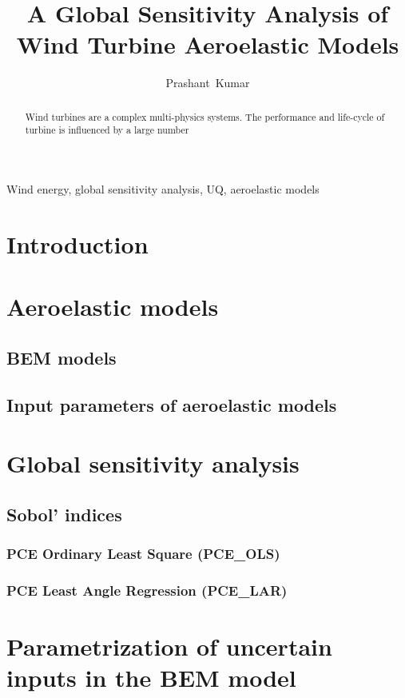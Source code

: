 \documentclass[review]{elsarticle}
\title{A Global Sensitivity Analysis of Wind Turbine Aeroelastic Models}
\numberwithin{equation}{section}
\numberwithin{equation}{section}
\begin{document}
\begin{frontmatter}
\author[]{Prashant~Kumar}
\begin{abstract}
Wind turbines are a complex multi-physics systems. The performance and life-cycle of turbine is influenced by a large number
\end{abstract}
\begin{keyword}
Wind energy, global sensitivity analysis, UQ, aeroelastic models 
\end{keyword}
\end{frontmatter}
\linenumbers
\section{Introduction}
\section{Aeroelastic models}
\subsection{BEM models}
\subsection{Input parameters of aeroelastic models}
\section{Global sensitivity analysis}
\subsection{Sobol' indices}
\subsubsection{PCE Ordinary Least Square (PCE\_OLS)}
\subsubsection{PCE Least Angle Regression (PCE\_LAR)}
\section{Parametrization of uncertain inputs in the BEM model}
\end{document}
